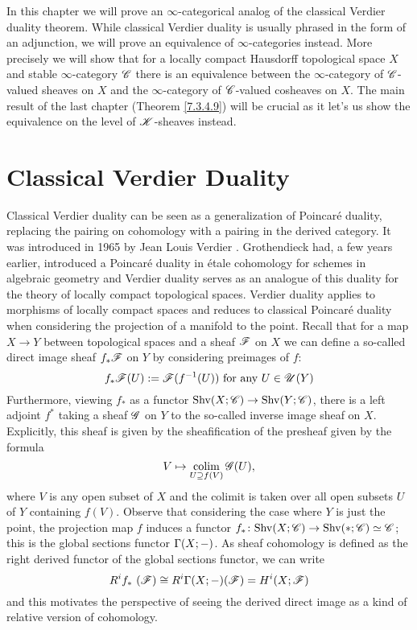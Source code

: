 \documentclass[../../thesis.tex]{subfiles}
\begin{document}
In this chapter we will prove an $\infty$-categorical analog of the classical Verdier duality theorem.
While classical Verdier duality is usually phrased in the form of an adjunction, we will prove an equivalence of $\infty$-categories instead.
More precisely we will show that for a locally compact Hausdorff topological space $X$ and stable $\infty$-category $\mathscr{C}$ there is an equivalence between the $\infty$-category of $\mathscr{C}$-valued sheaves on $X$ and the $\infty$-category of $\mathscr{C}$-valued cosheaves on $X$.
The main result of the last chapter (Theorem \ref{7.3.4.9}) will be crucial as it let's us show the equivalence on the level of $\mathscr{K}$-sheaves instead.
\section{Classical Verdier Duality}
Classical Verdier duality can be seen as a generalization of Poincaré duality, replacing the pairing on cohomology with a pairing in the derived category.
It was introduced in 1965 by Jean Louis Verdier \cite{Verdier95}.
Grothendieck had, a few years earlier, introduced a Poincaré duality in étale cohomology for schemes in algebraic geometry and Verdier duality serves as an analogue of this duality for the theory of locally compact topological spaces.
Verdier duality applies to morphisms of locally compact spaces and reduces to classical Poincaré duality when considering the projection of a manifold to the point.
Recall that for a map $X \to Y$ between topological spaces and a sheaf $\mathscr{F}$ on $X$ we can define a so-called direct image sheaf $f_*\mathscr{F}$ on $Y$ by considering preimages of $f$:
\[
    f_*\mathscr{F}(U) : = \mathscr{F}(f^{-1}(U)) \text{ for any }  U \in \mathscr{U}(Y)
\]
Furthermore, viewing $f_*$ as a functor $\mathrm{Shv}(X;\mathscr{C}) \to \mathrm{Shv}(Y; \mathscr{C})$, there is a left adjoint $f^*$ taking a sheaf $\mathscr{G}$ on $Y$ to the so-called inverse image sheaf on $X$.
Explicitly, this sheaf is given by the sheafification of the presheaf given by the formula
\[
    V \mapsto \operatorname*{colim}_{U \supseteq f(V)}\mathscr{G}(U),
\]
where $V$ is any open subset of $X$ and the colimit is taken over all open subsets $U$ of $Y$ containing $f(V)$.
Observe that considering the case where $Y$ is just the point, the projection map $f$ induces a functor $f_* \colon \mathrm{Shv}(X;\mathscr{C}) \to \mathrm{Shv}(*; \mathscr{C}) \simeq \mathscr{C}$; this is the global sections functor $\Gamma(X; {-})$.
As sheaf cohomology is defined as the right derived functor of the global sections functor, we can write
\[
    R^i f_* (\F) \cong R^i\Gamma(X;\blank)(\F) = H^i(X; \F)
\]
and this motivates the perspective of seeing the derived direct image as a kind of relative version of cohomology.
\end{document}
